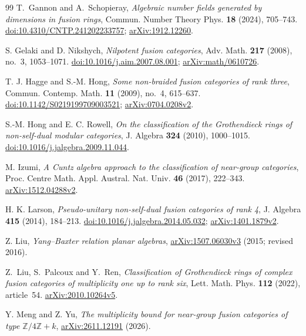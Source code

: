 \documentclass[11pt,a4paper]{article}
\numberwithin{equation}{section}
\begin{document}
\begin{thebibliography}{99}
T.~Gannon and A.~Schopieray,
\emph{Algebraic number fields generated by dimensions in fusion rings},
Commun. Number Theory Phys. \textbf{18} (2024), 705--743.
\href{https://doi.org/10.4310/CNTP.241202233757}{doi:10.4310/CNTP.241202233757};
\href{https://arxiv.org/abs/1912.12260}{arXiv:1912.12260}.

 S. Gelaki and D. Nikshych,
\emph{Nilpotent fusion categories}, Adv. Math. \textbf{217}
(2008), no.~3, 1053--1071.
\href{https://doi.org/10.1016/j.aim.2007.08.001}{doi:10.1016/j.aim.2007.08.001};
\href{https://arxiv.org/abs/math/0610726}{arXiv:math/0610726}.

 T. J. Hagge and S.-M. Hong,
\emph{Some non-braided fusion categories of rank three},
Commun. Contemp. Math. \textbf{11} (2009), no.~4, 615--637.
\href{https://doi.org/10.1142/S0219199709003521}{doi:10.1142/S0219199709003521};
\href{https://arxiv.org/abs/0704.0208v2}{arXiv:0704.0208v2}.

 S.-M. Hong and E. C. Rowell,
\emph{On the classification of the Grothendieck rings of non-self-dual modular categories},
J. Algebra \textbf{324} (2010), 1000--1015.
\href{https://doi.org/10.1016/j.jalgebra.2009.11.044}{doi:10.1016/j.jalgebra.2009.11.044}.

 M. Izumi,
\emph{A Cuntz algebra approach to the classification of near-group categories},
Proc. Centre Math. Appl. Austral. Nat. Univ. \textbf{46} (2017), 222--343.
\href{https://arxiv.org/abs/1512.04288v2}{arXiv:1512.04288v2}.

 H. K. Larson,
\emph{Pseudo-unitary non-self-dual fusion categories of rank 4},
J. Algebra \textbf{415} (2014), 184--213.
\href{https://doi.org/10.1016/j.jalgebra.2014.05.032}{doi:10.1016/j.jalgebra.2014.05.032};
\href{https://arxiv.org/abs/1401.1879v2}{arXiv:1401.1879v2}.

Z. Liu, \emph{Yang--Baxter relation planar algebras},
\href{https://arxiv.org/abs/1507.06030v3}{arXiv:1507.06030v3}
(2015; revised 2016).

Z.~Liu, S.~Palcoux and Y.~Ren,
\emph{Classification of Grothendieck rings of complex fusion categories
of multiplicity one up to rank six},
Lett. Math. Phys. \textbf{112} (2022), article~54.
\href{https://arxiv.org/abs/2010.10264v5}{arXiv:2010.10264v5}.

 Y. Meng and Z. Yu,
\emph{The multiplicity bound for near-group fusion categories of type
$\mathbb Z/4\mathbb Z+k$},
\href{https://arxiv.org/abs/2611.12191}{arXiv:2611.12191} (2026).


\end{thebibliography}
\end{document}
